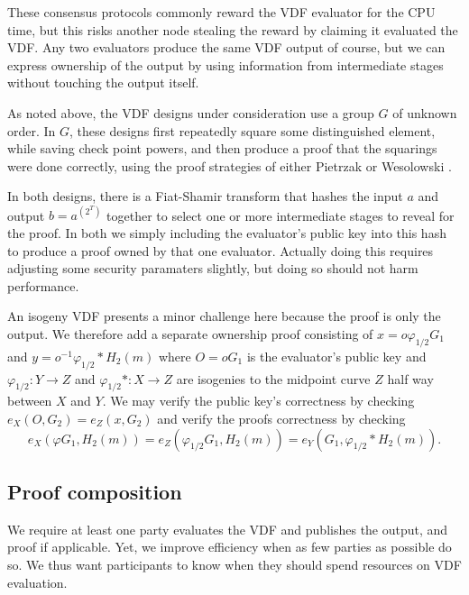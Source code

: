 \documentclass{article}
\newcommand\mathperiod{.}
\begin{document}
These consensus protocols commonly reward the VDF evaluator for the
CPU time, but this risks another node stealing the reward by claiming
it evaluated the VDF.  Any two evaluators produce the same VDF output
of course, but we can express ownership of the output by using
information from intermediate stages without touching the output itself.

As noted above, the VDF designs under consideration use a group $G$
of unknown order.  In $G$, these designs first repeatedly square
some distinguished element, while saving check point powers, and
then produce a proof that the squarings were done correctly, using
the proof strategies of
 either Pietrzak \cite{Pietrzak} or Wesolowski \cite{Wesolowski}.

In both designs, there is a Fiat-Shamir transform that hashes the
input $a$ and output $b = a^(2^T)$ together to select one or more
intermediate stages to reveal for the proof.  In both we simply
including the evaluator's public key into this hash to produce a
proof owned by that one evaluator.  Actually doing this requires
adjusting some security paramaters slightly, but doing so should not
harm performance. 

An isogeny VDF presents a minor challenge here because the proof
is only the output.  We therefore add a separate ownership proof
consisting of $x = o φ_{1/2} G_1$ and $y = o^{-1} φ_{1/2}* H_2(m)$
where $O = o G_1$ is the evaluator's public key and
$φ_{1/2} : Y \to Z$ and $φ_{1/2}* : X \to Z$ are isogenies to
the midpoint curve $Z$ half way between $X$ and $Y$.
We may verify the public key's correctness by checking
$e_X(O, G_2) = e_Z(x, G_2)$ and verify the proofs correctness by
checking
$$ e_X( φ G_1, H_2(m) ) = e_Z( φ_{1/2} G_1, H_2(m) ) = e_Y( G_1, φ_{1/2}* H_2(m) ) \mathperiod $$


\subsection{Proof composition}

We require at least one party evaluates the VDF and publishes the output, and proof if applicable.  Yet, we improve efficiency when as few parties as possible do so.  We thus want participants to know when they should spend resources on VDF evaluation.
\end{document}
